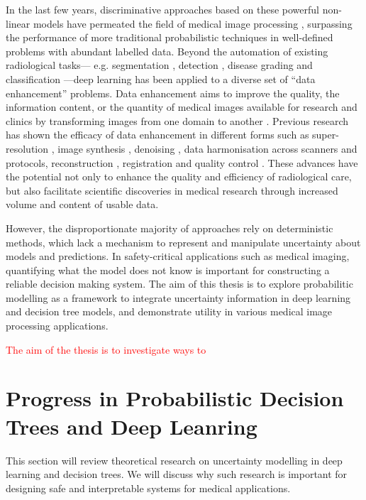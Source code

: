 In the last few years, discriminative approaches based on these powerful non-linear models have permeated the field of medical image processing \cite{criminisi2013decision,shen2017deep,litjens2017survey}, surpassing the performance of more traditional probabilistic techniques in well-defined problems with abundant labelled data. Beyond the automation of existing radiological tasks--- e.g. segmentation \cite{kamnitsas2017efficient}, detection \cite{roth2014new}, disease grading and classification \cite{araujo2017classification}---deep learning has been applied to a diverse set of ``data enhancement'' problems. Data enhancement aims to improve the quality, the information content, or the quantity of medical images available for research and clinics by transforming images from one domain to another \cite{isola2017image}. Previous research has shown the efficacy of data enhancement in different forms such as super-resolution \cite{oktay2016multi,chen2018efficient,ravi2019adversarial}, image synthesis \cite{nie2016estimating,kang2017deep}, denoising \cite{benou2017ensemble,chen2017low}, data harmonisation \cite{karayumak2018harmonizing,tax2019cross} across scanners and protocols, reconstruction \cite{sun2016deep,jin2017deep,hammernik2018learning,schlemper2018deep,zhu2018image,yang2018dagan,yoon2019efficient}, registration \cite{sokooti2017nonrigid,balakrishnan2018unsupervised} and quality control \cite{wu2017fuiqa,esses2018automated}.  These advances have the potential not only to enhance the quality and efficiency of radiological care, but also facilitate scientific discoveries in medical research through increased volume and content of usable data. 

However, the disproportionate majority of approaches rely on deterministic methods, which lack a mechanism to represent and manipulate uncertainty about models and predictions. In safety-critical applications such as medical imaging, quantifying what the model does not know is important for constructing a reliable decision making system. The aim of this thesis is to explore probabilitic modelling as a framework to integrate uncertainty information in deep learning and decision tree models, and demonstrate utility in various medical image processing applications. 
 
\textcolor{red}{The aim of the thesis is to investigate ways to } 

 
\section{Progress in Probabilistic Decision Trees and Deep Leanring}
This section will review theoretical research on uncertainty modelling in deep learning and decision trees. We will discuss why such research is important for designing safe and interpretable systems for medical applications. 

